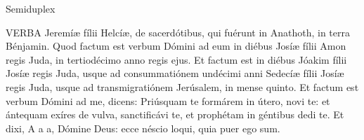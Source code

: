 

 Semiduplex






\lettrine[lines=2]{V}{ERBA} Jeremíæ fílii Helcíæ, de sacerdótibus, qui fuérunt in Anathoth, in terra Bénjamin. Quod factum est verbum Dómini ad eum in diébus Josíæ fílii Amon regis Juda, in tertiodécimo anno regis ejus. Et factum est in diébus Jóakim fílii Josíæ regis Juda, usque ad consummatiónem undécimi anni Sedecíæ fílii Josíæ regis Juda, usque ad transmigratiónem Jerúsalem, in mense quinto. Et factum est verbum Dómini ad me, dicens: Priúsquam te formárem in útero, novi te: et ántequam exíres de vulva, sanctificávi te, et prophétam in géntibus dedi te. Et dixi, A a a, Dómine Deus: ecce néscio loqui, quia puer ego sum.

